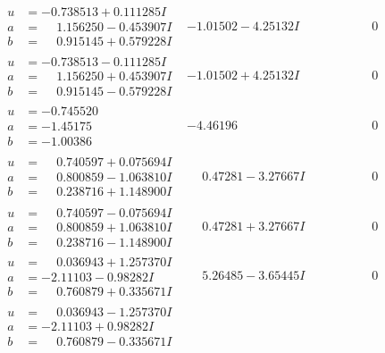 \documentclass[1p]{elsarticle_modified}
\theoremstyle{definition}
\begin{document}
$$\begin{array}{c|c|c}
\begin{aligned}
u &= -0.738513 + 0.111285 I \\
a &= \phantom{-}1.156250 - 0.453907 I \\
b &= \phantom{-}0.915145 + 0.579228 I\end{aligned}
 & -1.01502 - 4.25132 I & \phantom{-0.000000 } 0 \\ \hline\begin{aligned}
u &= -0.738513 - 0.111285 I \\
a &= \phantom{-}1.156250 + 0.453907 I \\
b &= \phantom{-}0.915145 - 0.579228 I\end{aligned}
 & -1.01502 + 4.25132 I & \phantom{-0.000000 } 0 \\ \hline\begin{aligned}
u &= -0.745520\phantom{ +0.000000I} \\
a &= -1.45175\phantom{ +0.000000I} \\
b &= -1.00386\phantom{ +0.000000I}\end{aligned}
 & -4.46196\phantom{ +0.000000I} & \phantom{-0.000000 } 0 \\ \hline\begin{aligned}
u &= \phantom{-}0.740597 + 0.075694 I \\
a &= \phantom{-}0.800859 - 1.063810 I \\
b &= \phantom{-}0.238716 + 1.148900 I\end{aligned}
 & \phantom{-}0.47281 - 3.27667 I & \phantom{-0.000000 } 0 \\ \hline\begin{aligned}
u &= \phantom{-}0.740597 - 0.075694 I \\
a &= \phantom{-}0.800859 + 1.063810 I \\
b &= \phantom{-}0.238716 - 1.148900 I\end{aligned}
 & \phantom{-}0.47281 + 3.27667 I & \phantom{-0.000000 } 0 \\ \hline\begin{aligned}
u &= \phantom{-}0.036943 + 1.257370 I \\
a &= -2.11103 - 0.98282 I \\
b &= \phantom{-}0.760879 + 0.335671 I\end{aligned}
 & \phantom{-}5.26485 - 3.65445 I & \phantom{-0.000000 } 0 \\ \hline\begin{aligned}
u &= \phantom{-}0.036943 - 1.257370 I \\
a &= -2.11103 + 0.98282 I \\
b &= \phantom{-}0.760879 - 0.335671 I\end{aligned}

\end{array}$$
\end{document}
